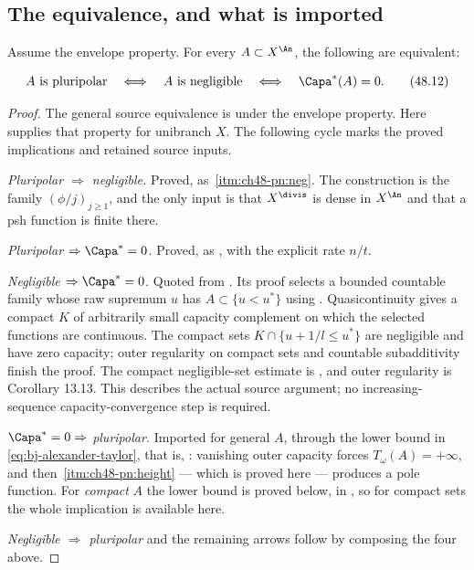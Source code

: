 \subsection{The equivalence, and what is imported}
\label{sec:ch48-equivalence}

\begin{theorem}\label{thm:bj-small-set-equivalence}
Assume the envelope property.  For every $A\subset X^{\An}$, the
following are equivalent:

\[
 A\text{ is pluripolar}
 \quad\Longleftrightarrow\quad
 A\text{ is negligible}
 \quad\Longleftrightarrow\quad
 \Capa^*(A)=0.
\tag{48.12}\label{eq:bj-small-set-equivalence}
\]
\end{theorem}

\begin{proof}
The general source equivalence is
\cite[Theorems~13.14 and~13.17]{BJ22} under the envelope property.
Here 
supplies that property for unibranch $X$. The following cycle marks
the proved implications and retained source inputs.

\emph{Pluripolar $\Rightarrow$ negligible.}  Proved, as
\,\cref{itm:ch48-pn:neg}.  The
construction is the family $(\phi/j)_{j\ge1}$, and the only input is that
$X^{\divis}$ is dense in $X^{\An}$ and that a psh function is finite
there.

\emph{Pluripolar $\Rightarrow\Capa^*=0$.}  Proved, as
, with the explicit rate $n/t$.

\emph{Negligible $\Rightarrow\Capa^*=0$.} Quoted from
\cite[Lemma~13.19]{BJ22}. Its proof selects a bounded countable family
whose raw supremum $u$ has $A\subset\{u<u^*\}$ using
\cite[Corollary~12.22]{BJ22}. Quasicontinuity gives a compact $K$ of
arbitrarily small capacity complement on which the selected functions
are continuous. The compact sets
$K\cap\{u+1/l\le u^*\}$ are negligible and have zero capacity;
outer regularity on compact sets and countable subadditivity finish
the proof. The compact negligible-set estimate is
\cite[Example~13.6]{BJ22}, and outer regularity is Corollary 13.13.
This describes the actual source argument; no increasing-sequence
capacity-convergence step is required.

\emph{$\Capa^*=0\Rightarrow$ pluripolar.}  Imported for general $A$,
through the lower bound in \eqref{eq:bj-alexander-taylor}, that is,
\cite[Theorem~13.14]{BJ22}: vanishing outer capacity forces
$T_\omega(A)=+\infty$, and then
\,\cref{itm:ch48-pn:height} --- which
is proved here --- produces a pole function.  For \emph{compact} $A$ the
lower bound is proved below, in , so for compact
sets the whole implication is available here.

\emph{Negligible $\Rightarrow$ pluripolar} and the remaining arrows follow
by composing the four above.
\end{proof}


